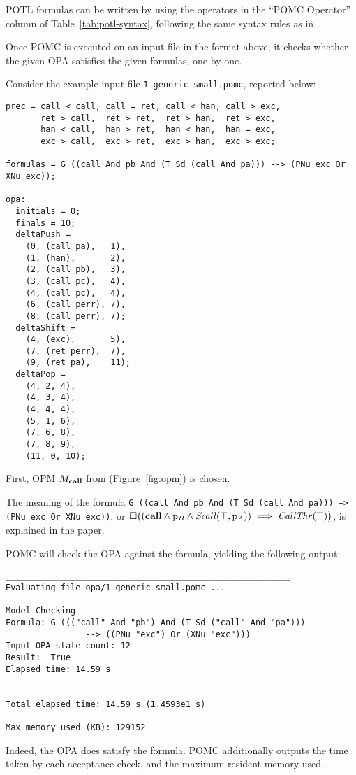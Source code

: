 \documentclass{article}
\begin{document}
POTL formulas can be written by using the operators in the ``POMC Operator'' column
of Table~\ref{tab:potl-syntax}, following the same syntax rules as in \cite{ChiariMP19}.

Once POMC is executed on an input file in the format above,
it checks whether the given OPA satisfies the given formulas,
one by one.

Consider the example input file \texttt{1-generic-small.pomc}, reported below:
\begin{verbatim}
prec = call < call, call = ret, call < han, call > exc,
       ret > call,  ret > ret,  ret > han,  ret > exc,
       han < call,  han > ret,  han < han,  han = exc,
       exc > call,  exc > ret,  exc > han,  exc > exc;

formulas = G ((call And pb And (T Sd (call And pa))) --> (PNu exc Or XNu exc));

opa:
  initials = 0;
  finals = 10;
  deltaPush =
    (0, (call pa),   1),
    (1, (han),       2),
    (2, (call pb),   3),
    (3, (call pc),   4),
    (4, (call pc),   4),
    (6, (call perr), 7),
    (8, (call perr), 7);
  deltaShift =
    (4, (exc),       5),
    (7, (ret perr),  7),
    (9, (ret pa),    11);
  deltaPop =
    (4, 2, 4),
    (4, 3, 4),
    (4, 4, 4),
    (5, 1, 6),
    (7, 6, 8),
    (7, 8, 9),
    (11, 0, 10);
\end{verbatim}
First, OPM $M_{\mathbf{call}}$ from \cite{ChiariMP19} (Figure~\ref{fig:opm}) is chosen.

The meaning of the formula
\texttt{G ((call And pb And (T Sd (call And pa))) --> (PNu exc Or XNu exc))},
or
\(
  \square \big((\mathbf{call} \land \mathrm{p}_B \land
    \mathit{Scall}(\top, \mathrm{p}_A))
    \implies \mathit{CallThr}(\top) \big)
\),
is explained in the paper.

POMC will check the OPA against the formula, yielding the following output:
\begin{verbatim}
_________________________________________________________
Evaluating file opa/1-generic-small.pomc ...

Model Checking
Formula: G ((("call" And "pb") And (T Sd ("call" And "pa")))
                --> ((PNu "exc") Or (XNu "exc")))
Input OPA state count: 12
Result:  True
Elapsed time: 14.59 s


Total elapsed time: 14.59 s (1.4593e1 s)

Max memory used (KB): 129152
\end{verbatim}
Indeed, the OPA does satisfy the formula.
POMC additionally outputs the time taken by each acceptance check,
and the maximum resident memory used.
\end{document}
